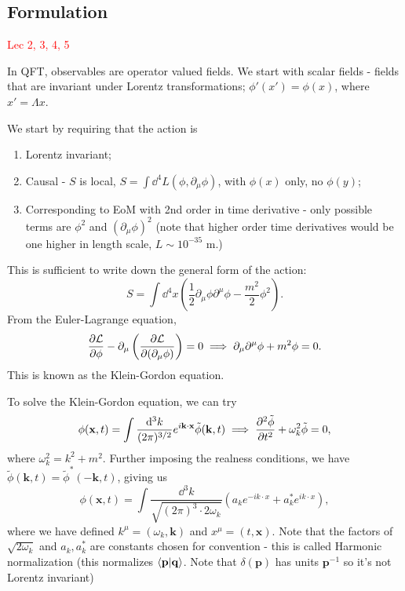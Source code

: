 \documentclass{article}
\begin{document}
\subsection{Formulation}
\textcolor{red}{Lec 2, 3, 4, 5}

In QFT, observables are operator valued fields. We start with scalar fields - fields that are invariant under Lorentz transformations; $\phi'(x')=\phi(x)$, where $x'=\Lambda x$.

We start by requiring that the action is
\begin{enumerate}
    \item Lorentz invariant; 
    \item Causal - $S$ is local, $S=\int\dd^4 L(\phi,\partial_\mu\phi)$, with $\phi(x)$ only, no $\phi(y)$;
    \item Corresponding to EoM with 2nd order in time derivative - only possible terms are $\phi^2$ and $(\partial_\mu\phi)^2$ (note that higher order time derivatives would be one higher in length scale, $L\sim 10^{-35}$ m.)
\end{enumerate}
This is sufficient to write down the general form of the action:
$$S=\int\dd^4x\left(\frac 12\partial_\mu\phi\partial^\mu\phi-\frac{m^2}2\phi^2\right).$$
From the Euler-Lagrange equation,
$$ \frac{\partial \mathcal L}{\partial \phi}-\partial_\mu\left( \frac{\partial \mathcal L}{\partial (\partial_\mu\phi)}\right)=0\implies\partial_\mu\partial^\mu\phi+m^2\phi=0.$$
This is known as the Klein-Gordon equation.

To solve the Klein-Gordon equation, we can try 
$$\phi(\mathbf x,t)=\int\frac{\dd^3k}{(2\pi)^{3/2}}e^{i\mathbf k\cdot\mathbf x}\tilde\phi(\mathbf k,t)\implies \frac{\partial^{2}\tilde\phi}{\partial{t}^{2}}+\omega_k^2\tilde\phi=0,$$
where $\omega_k^2=k^2+m^2$. Further imposing the realness conditions, we have $\tilde\phi(\mathbf k,t)=\tilde\phi^*(-\mathbf k,t)$, giving us
\begin{equation}
    \phi(\mathbf x,t)=\int\frac{\dd^3k}{\sqrt{(2\pi)^3\cdot 2\omega_k}}\left(a_ke^{-ik\cdot x}+a^*_ke^{ik\cdot x}\right),
\end{equation}
where we have defined $k^\mu=(\omega_k,\mathbf k)$ and $x^\mu=(t,\mathbf x)$. Note that the factors of $\sqrt{2\omega_k}$ and $a_k,a^*_k$ are constants chosen for convention - this is called Harmonic normalization (this normalizes $\braket{\mathbf p}{\mathbf q}$. Note that $\delta(\mathbf p)$ has units $\mathbf p^{-1}$ so it's not Lorentz invariant)
\end{document}
